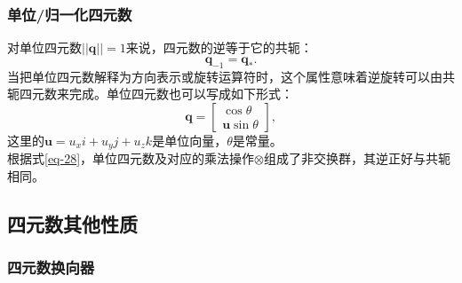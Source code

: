 \documentclass[10pt, a4paper]{article}
\begin{document}
  \subsubsection{单位/归一化四元数}
  对单位四元数$||\mathbf{q}|| = 1$来说，四元数的逆等于它的共轭：
  \begin{equation} \label{eq-31}
    \mathbf{q}_{-1} = \mathbf{q}_{*} .
  \end{equation}
  当把单位四元数解释为方向表示或旋转运算符时，这个属性意味着逆旋转可以由共轭四元数来完成。单位四元数也可以写成如下形式：
  \begin{equation} \label{eq-32}
    \mathbf{q} =
    \begin{bmatrix}
      \cos\theta \\
      \mathbf{u}\sin\theta
    \end{bmatrix} ,
  \end{equation}
  这里的$\mathbf{u} = u_xi + u_yj + u_zk$是单位向量，$\theta$是常量。\\
  根据式\eqref{eq-28}，单位四元数及对应的乘法操作$\otimes$组成了非交换群，其逆正好与共轭相同。

  \subsection{四元数其他性质}
  \subsubsection{四元数换向器}
\end{document}
